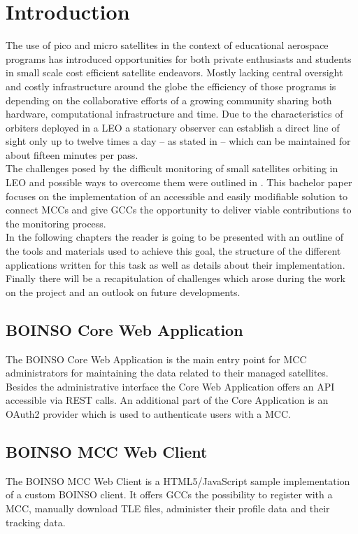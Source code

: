 \documentclass[BachelorPaper]{subfiles}
\begin{document}
\chapter{Introduction}
The use of pico and micro satellites in the context of educational aerospace programs has introduced opportunities for both private enthusiasts and students in small scale cost efficient satellite endeavors. Mostly lacking central oversight and costly infrastructure around the globe the efficiency of those programs is depending on the collaborative efforts of a growing community sharing both hardware, computational infrastructure and time. Due to the characteristics of orbiters deployed in a \ac{LEO} a stationary observer  can establish a direct line of sight only up to twelve times a day -- as stated in \cite{kief_genso_2011} -- which can be maintained for about fifteen minutes per pass.\\

The challenges posed by the difficult monitoring of small satellites orbiting in \ac{LEO} and possible ways to overcome them were outlined in \cite{beyerle_boinso_2014}. This bachelor paper focuses on the implementation of an accessible and easily modifiable solution to connect \acp{MCC} and give \acp{GCC} the opportunity to deliver viable contributions to the monitoring process.\\

In the following chapters the reader is going to be presented with an outline of the tools and materials used to achieve this goal, the structure of the different applications written for this task as well as details about their implementation. Finally there will be a recapitulation of challenges which arose during the work on the project and an outlook on future developments.

\section{BOINSO Core Web Application}
\label{sec:intro_boinso_core}
The BOINSO Core Web Application is the main entry point for \ac{MCC} administrators for maintaining the data related to their managed satellites. Besides the administrative interface the Core Web Application offers an \ac{API} accessible via \ac{REST} calls. An additional part of the Core Application is an OAuth2 provider which is used to authenticate users with a \ac{MCC}.

\section{BOINSO MCC Web Client}
\label{sec:intro_boinso_web}
The BOINSO MCC Web Client is a HTML5/JavaScript sample implementation of a custom BOINSO client. It offers \acp{GCC} the possibility to register with a \ac{MCC}, manually download \ac{TLE} files, administer their profile data and their tracking data.
\end{document}
